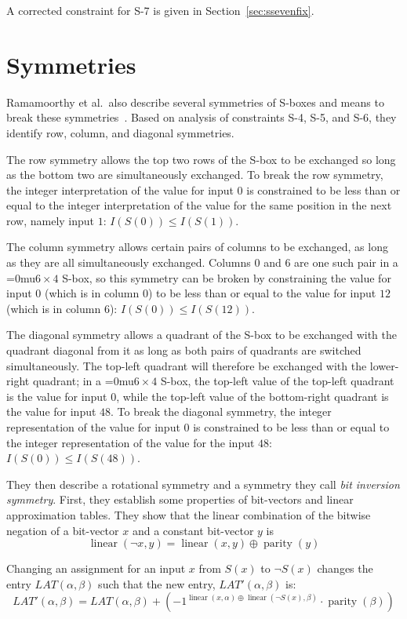 \documentclass[a4paper,10pt,twoside,openright]{book}
\newcommand*\sixbyfour{\begingroup\medmuskip=0mu\relax$6 \times 4$\endgroup}
\DeclareMathOperator{\parity}{parity}
\DeclareMathOperator{\lin}{linear}
\begin{document}
A corrected constraint for S-7 is given in Section~\ref{sec:ssevenfix}.

\section{Symmetries}
\label{sec:symmetries}

Ramamoorthy et al.\ also describe several symmetries of S-boxes and means to break these symmetries~\cite{sboxsymmetry}.
Based on analysis of constraints S-4, S-5, and S-6, they identify row, column, and diagonal symmetries.

The row symmetry allows the top two rows of the S-box to be exchanged so long as the bottom two are simultaneously exchanged.
To break the row symmetry, the integer interpretation of the value for input $0$ is constrained 
to be less than or equal to the integer interpretation of the value for the same position in the next row, namely input $1$:
$I(S(0)) \leq I(S(1))$.

The column symmetry allows certain pairs of columns to be exchanged, as long as they are all simultaneously exchanged.
Columns $0$ and $6$ are one such pair in a \sixbyfour{} S-box, 
so this symmetry can be broken by constraining the 
value for input $0$ (which is in column 0) to be less than or equal to the 
value for input $12$ (which is in column $6$):
$I(S(0)) \leq I(S(12))$.

The diagonal symmetry allows a quadrant of the S-box to be exchanged with the quadrant diagonal from it 
as long as both pairs of quadrants are switched simultaneously.
The top-left quadrant will therefore be exchanged with the lower-right quadrant;
in a \sixbyfour{} S-box, the top-left value of the top-left quadrant is the 
value for input $0$, while the top-left value of the bottom-right quadrant
is the value for input $48$.
To break the diagonal symmetry, 
the integer representation of
the value for input $0$ is constrained
to be less than or equal to 
the integer representation of
the value for the input $48$:
$I(S(0)) \leq I(S(48))$.

They then describe a rotational symmetry and a symmetry they call \textit{bit inversion symmetry}.
First, they establish some properties of bit-vectors and linear approximation tables. 
They show that the linear combination of the bitwise negation of a bit-vector $x$ and a constant bit-vector $y$ is
\[\lin(\lnot x, y) = \lin(x,y) \oplus \parity(y)\]

Changing an assignment for an input $x$ from $S(x)$ to $\lnot S(x)$ changes the entry $\mathit{LAT}(\alpha,\beta)$ 
such that the new entry, $\mathit{LAT}'(\alpha,\beta)$ is:
\[
\mathit{LAT}'(\alpha,\beta) = \mathit{LAT}(\alpha,\beta) + \left(
-1^{\lin(x,\alpha) \oplus \lin(\lnot S(x), \beta)} \cdot \parity(\beta)
\right) \]
\end{document}
